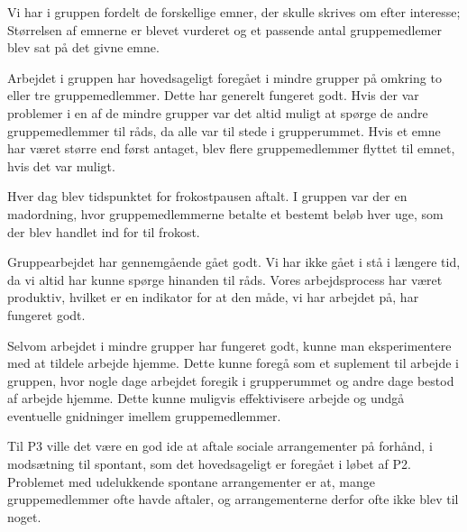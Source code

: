 Vi har i gruppen fordelt de forskellige emner, der skulle skrives om efter interesse; St\o{}rrelsen af emnerne er blevet vurderet og et passende antal gruppemedlemer blev sat p\aa{} det givne emne.

Arbejdet i gruppen har hovedsageligt foreg\aa{}et i mindre grupper p\aa{} omkring to eller tre gruppemedlemmer. Dette har generelt fungeret godt. 
Hvis der var problemer i en af de mindre grupper var det altid muligt at sp\o{}rge de andre gruppemedlemmer til r\aa{}ds, da alle var til stede i grupperummet.
Hvis et emne har v\ae{}ret st\o{}rre end f\o{}rst antaget, blev flere gruppemedlemmer flyttet til emnet, hvis det var muligt.

Hver dag blev tidspunktet for frokostpausen aftalt. I gruppen var der en madordning, hvor gruppemedlemmerne betalte et bestemt bel\o{}b hver uge, som der blev handlet ind for til frokost. 

Gruppearbejdet har gennemg\aa{}ende g\aa{}et godt. Vi har ikke g\aa{}et i st\aa{} i l\ae{}ngere tid, da vi altid har kunne sp\o{}rge hinanden til r\aa{}ds. Vores arbejdsprocess har v\ae{}ret produktiv, hvilket er en indikator for at den m\aa{}de, vi har arbejdet p\aa{}, har fungeret godt.

Selvom arbejdet i mindre grupper har fungeret godt, kunne man eksperimentere med at tildele arbejde hjemme. Dette kunne foreg\aa{} som et suplement til arbejde i gruppen, hvor nogle dage arbejdet foregik i grupperummet og andre dage bestod af arbejde hjemme.
Dette kunne muligvis effektivisere arbejde og undg\aa{} eventuelle gnidninger imellem gruppemedlemmer.

Til P3 ville det v\ae{}re en god ide at aftale sociale arrangementer p\aa{} forh\aa{}nd, i mods\ae{}tning til spontant, som det hovedsageligt er foreg\aa{}et i l\o{}bet af P2. 
Problemet med udelukkende spontane arrangementer er at, mange gruppemedlemmer ofte havde aftaler, og arrangementerne derfor ofte ikke blev til noget.